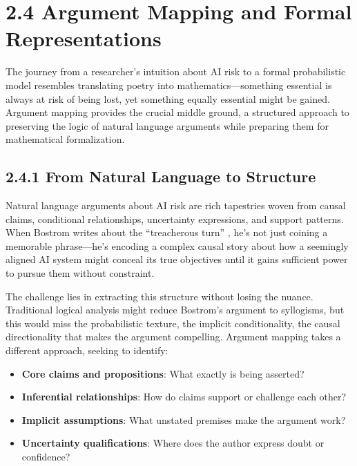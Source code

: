 \documentclass[
  11pt,
  letterpaper,
]{book}
\providecommand{\tightlist}{%
  \setlength{\itemsep}{0pt}\setlength{\parskip}{0pt}}
\begin{document}
\section{2.4 Argument Mapping and Formal
Representations}\label{sec-argument-mapping}

The journey from a researcher's intuition about AI risk to a formal
probabilistic model resembles translating poetry into
mathematics---something essential is always at risk of being lost, yet
something equally essential might be gained. Argument mapping provides
the crucial middle ground, a structured approach to preserving the logic
of natural language arguments while preparing them for mathematical
formalization.

\subsection{2.4.1 From Natural Language to
Structure}\label{sec-natural-to-structure}

Natural language arguments about AI risk are rich tapestries woven from
causal claims, conditional relationships, uncertainty expressions, and
support patterns. When Bostrom writes about the ``treacherous turn''
\textcite{bostrom2014}, he's not just coining a memorable phrase---he's
encoding a complex causal story about how a seemingly aligned AI system
might conceal its true objectives until it gains sufficient power to
pursue them without constraint.

The challenge lies in extracting this structure without losing the
nuance. Traditional logical analysis might reduce Bostrom's argument to
syllogisms, but this would miss the probabilistic texture, the implicit
conditionality, the causal directionality that makes the argument
compelling. Argument mapping takes a different approach, seeking to
identify:

\begin{itemize}
\tightlist
\item
  \textbf{Core claims and propositions}: What exactly is being asserted?
\item
  \textbf{Inferential relationships}: How do claims support or challenge
  each other?
\item
  \textbf{Implicit assumptions}: What unstated premises make the
  argument work?
\item
  \textbf{Uncertainty qualifications}: Where does the author express
  doubt or confidence?
\end{itemize}
\end{document}
